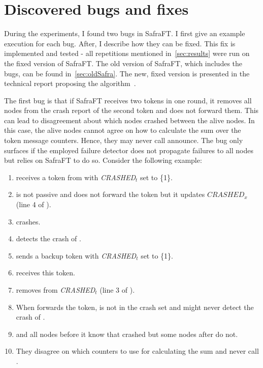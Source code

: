 \section{Discovered bugs and fixes}
\label{sec:safraBugs}

During the experiments, I found two bugs in SafraFT.
I first give an example execution for each bug.
After, I describe how they can be fixed.
This fix is implemented and tested - all repetitions mentioned in~\cref{sec:results} were run on the fixed version of SafraFT.
The old version of SafraFT, which includes the bugs, can be found in~\cref{sec:oldSafra}.
The new, fixed version is presented in the technical report proposing the algorithm~\cite{safraFT2018}.

The first bug is that if SafraFT receives two tokens in one round, it removes all nodes from the crash report of the second token and does not forward them.
This can lead to disagreement about which nodes crashed between the alive nodes.
In this case, the alive nodes cannot agree on how to calculate the sum over the token message counters.
Hence, they may never call announce.
The bug only surfaces if the employed failure detector does not propagate failures to all nodes but relies on SafraFT to do so.
Consider the following example:

\begin{enumerate}
	\item {} receives a token from  with \textit{CRASHED}$_t$ set to \{1\}.
	\item {} is not passive and does not forward the token but it updates $CRASHED_x$ (line 4 of ).
	\item {} crashes.
	\item {} detects the crash of .
	\item {} sends a backup token with \textit{CRASHED}$_t$ set to \{1\}.
	\item {} receives this token.
	\item {} removes  from \textit{CRASHED}$_t$ (line 3 of ).
	\item When  forwards the token,  is not in the crash set and  might never detect the crash of .
	\item {} and all nodes before it know that  crashed but some nodes after  do not.
	\item They disagree on which counters to use for calculating the sum and never call .
\end{enumerate}

